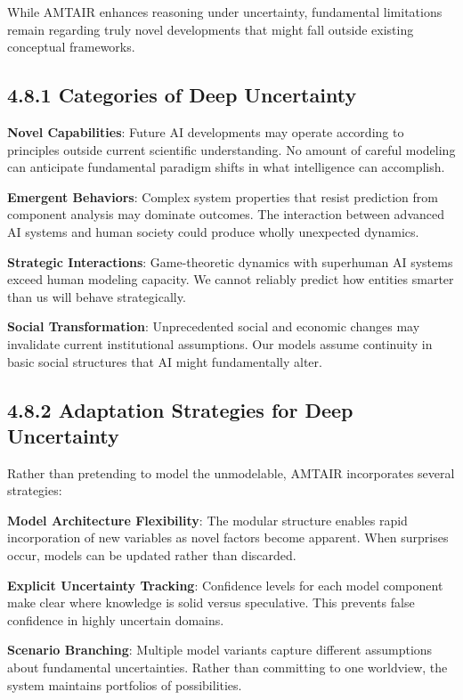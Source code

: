 \documentclass[
  11pt,
  letterpaper,
]{book}
\begin{document}
While AMTAIR enhances reasoning under uncertainty, fundamental
limitations remain regarding truly novel developments that might fall
outside existing conceptual frameworks.

\subsection{4.8.1 Categories of Deep
Uncertainty}\label{sec-uncertainty-categories}

\textbf{Novel Capabilities}: Future AI developments may operate
according to principles outside current scientific understanding. No
amount of careful modeling can anticipate fundamental paradigm shifts in
what intelligence can accomplish.

\textbf{Emergent Behaviors}: Complex system properties that resist
prediction from component analysis may dominate outcomes. The
interaction between advanced AI systems and human society could produce
wholly unexpected dynamics.

\textbf{Strategic Interactions}: Game-theoretic dynamics with superhuman
AI systems exceed human modeling capacity. We cannot reliably predict
how entities smarter than us will behave strategically.

\textbf{Social Transformation}: Unprecedented social and economic
changes may invalidate current institutional assumptions. Our models
assume continuity in basic social structures that AI might fundamentally
alter.

\subsection{4.8.2 Adaptation Strategies for Deep
Uncertainty}\label{sec-adaptation-strategies}

Rather than pretending to model the unmodelable, AMTAIR incorporates
several strategies:

\textbf{Model Architecture Flexibility}: The modular structure enables
rapid incorporation of new variables as novel factors become apparent.
When surprises occur, models can be updated rather than discarded.

\textbf{Explicit Uncertainty Tracking}: Confidence levels for each model
component make clear where knowledge is solid versus speculative. This
prevents false confidence in highly uncertain domains.

\textbf{Scenario Branching}: Multiple model variants capture different
assumptions about fundamental uncertainties. Rather than committing to
one worldview, the system maintains portfolios of possibilities.
\end{document}
